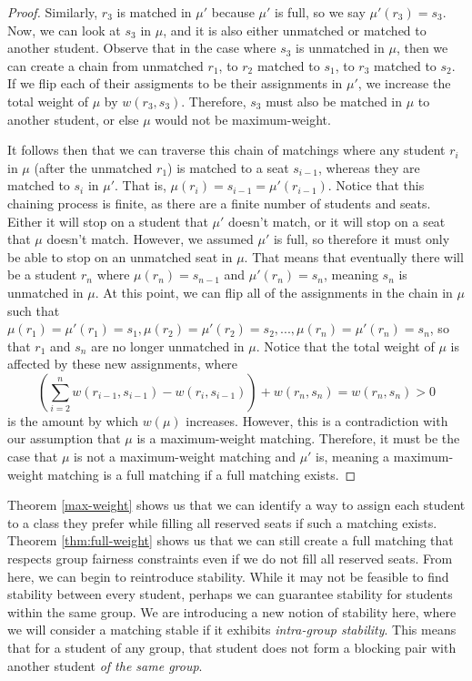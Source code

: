 \begin{proof}
  Similarly, $r_3$ is matched in $\mu'$ because $\mu'$ is full, so we say
  $\mu'(r_3) = s_3$. Now, we can look at $s_3$ in $\mu$, and it is also either
  unmatched or matched to another student. Observe that in the case where $s_3$
  is unmatched in $\mu$, then we can create a chain from unmatched $r_1$, to $r_2$ matched
  to $s_1$, to $r_3$ matched to $s_2$. If we flip each of their assigments to
  be their assignments in $\mu'$, we increase the total weight of $\mu$ by
  $w(r_3, s_3)$. Therefore, $s_3$ must also be matched in $\mu$ to another
  student, or else $\mu$ would not be maximum-weight. 

  It follows then that we can traverse this chain of matchings where any student
  $r_i$ in $\mu$ (after the unmatched $r_1$) is matched to a seat $s_{i-1}$,
  whereas they are matched to $s_i$ in $\mu'$. That is, $\mu(r_i) = s_{i-1} =
  \mu'(r_{i-1})$. Notice that this chaining process is finite, as there are a finite
  number of students and seats. Either it will stop on a student that $\mu'$ doesn't
  match, or it will stop on a seat that $\mu$ doesn't match. However, we assumed
  $\mu'$ is full, so therefore it must only be able to stop on an unmatched seat in $\mu$. 
  That means that eventually there will be a student $r_n$ where $\mu(r_n) = s_{n-1}$ and $\mu'(r_n) =
  s_n$, meaning $s_n$ is unmatched in $\mu$. At this point, we can flip all of
  the assignments in the chain in $\mu$ such that $\mu(r_1) = \mu'(r_1) = s_1,
  \mu(r_2) = \mu'(r_2) = s_2, ..., \mu(r_n) = \mu'(r_n) = s_n$, so that $r_1$
  and $s_n$ are no longer unmatched in $\mu$. Notice that the total weight of $\mu$
  is affected by these new assignments, where \[\left(\sum_{i = 2}^{n}w(r_{i-1},
    s_{i-1}) - w(r_i, s_{i-1})\right) + w(r_n, s_n) = w(r_n,
  s_n) > 0\] is the amount by which
  $w(\mu)$ increases.  However, this
  is a contradiction with our assumption that $\mu$ is a maximum-weight
  matching. Therefore, it must be the case that $\mu$ is not a maximum-weight
  matching and $\mu'$ is, meaning a maximum-weight matching is a full matching
  if a full matching exists. 
\end{proof}


Theorem \ref{max-weight} shows us that we can identify a way to 
assign each student to a class they prefer while filling all reserved seats if
such a matching exists. Theorem \ref{thm:full-weight} shows us that we can still
create a full matching that respects group fairness
constraints even if we do not fill all reserved seats. From here, we can begin to reintroduce
stability. While it may not be feasible to find stability between every student,
perhaps we can guarantee stability for students within the same group.  We are
introducing a new notion of stability here, where we will consider a matching
stable if it exhibits \textit{intra-group stability}. This
means that for a student of any group, that student does not form a blocking pair
with another student \textit{of the same group}.

